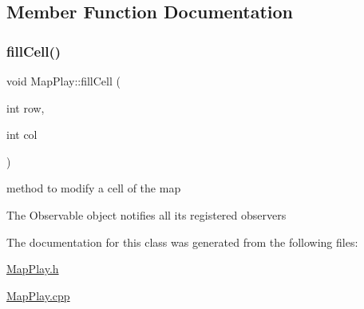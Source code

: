 \subsection{Member Function Documentation}
\hypertarget{class_map_play_a1f9b85a315373ef67846db347f6d4adc}{}\label{class_map_play_a1f9b85a315373ef67846db347f6d4adc} 
\subsubsection{\texorpdfstring{fill\+Cell()}{fillCell()}}
{\footnotesize\ttfamily void Map\+Play\+::fill\+Cell (\begin{DoxyParamCaption}\item[{int}]{row,  }\item[{int}]{col }\end{DoxyParamCaption})}



method to modify a cell of the map 

The Observable object notifies all its registered observers 

The documentation for this class was generated from the following files\+:\begin{DoxyCompactItemize}
\item 
\hyperlink{_map_play_8h}{Map\+Play.\+h}\item 
\hyperlink{_map_play_8cpp}{Map\+Play.\+cpp}\end{DoxyCompactItemize}
